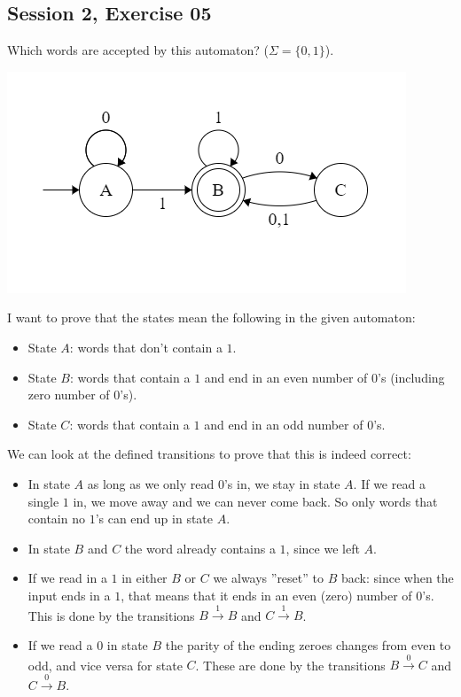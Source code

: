 \subsection{Session 2, Exercise 05}


Which words are accepted by this automaton? ($\Sigma=\{0,1\}$).

\includegraphics[width=0.5\linewidth]{02/2_5_automaton.png}


I want to prove that the states mean the following in the given automaton:

\begin{itemize}
    \item State $A$: words that don't contain a $1$.
    \item State $B$: words that contain a $1$ and end in an even number of $0$'s (including zero number of $0$'s).
    \item State $C$: words that contain a $1$ and end in an odd number of $0$'s.
\end{itemize}

We can look at the defined transitions to prove that this is indeed correct:

\begin{itemize}
    \item In state $A$ as long as we only read $0$'s in, we stay in state $A$. If we read a single $1$ in, we move away and we can never come back. So only words that contain no $1$'s can end up in state $A$.
    \item In state $B$ and $C$ the word already contains a $1$, since we left $A$.
    \item If we read in a $1$ in either $B$ or $C$ we always ''reset'' to $B$ back: since when the input ends in a $1$, that means that it ends in an even (zero) number of $0$'s. This is done by the transitions $B\xrightarrow{1}B$ and $C\xrightarrow{1}B$.
    \item If we read a $0$ in state $B$ the parity of the ending zeroes changes from even to odd, and vice versa for state $C$. These are done by the transitions $B\xrightarrow{0}C$ and $C\xrightarrow{0}B$.
\end{itemize}


